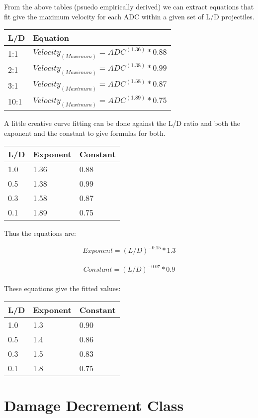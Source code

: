 From the above tables (psuedo empirically derived) we can extract 
equations that fit give the maximum velocity for each ADC within a
given set of L/D projectiles.

\begin{tabular}{||l|l||} \hline 
L/D			& Equation \\ \hline 
1:1			& \(Velocity_{(Maximum)} = ADC^{(1.36)} * 0.88 \)\\  
2:1			& \(Velocity_{(Maximum)} = ADC^{(1.38)} * 0.99 \) \\
3:1			& \(Velocity_{(Maximum)} = ADC^{(1.58)} * 0.87 \) \\
10:1		& \(Velocity_{(Maximum)} = ADC^{(1.89)} * 0.75 \) \\ 
\hline 
\end{tabular}

A little creative curve fitting can be done against the L/D ratio 
and both the exponent and the constant to give formulas for both.

\begin{tabular}{||l|l|l||} \hline 
L/D	& Exponent	& Constant \\ \hline 
1.0	& 1.36	   & 0.88 \\
0.5 & 1.38     & 0.99 \\
0.3 & 1.58     & 0.87 \\
0.1 & 1.89     & 0.75 \\ \hline 
\end{tabular}

Thus the equations are:

\[Exponent = (L/D)^{-0.15} * 1.3 \] \\  
\[Constant = (L/D)^{-0.07} * 0.9 \] \\

These equations give the fitted values:

\begin{tabular}{||l|l|l||} \hline   
L/D	& Exponent	& Constant \\ \hline 
1.0 & 1.3       &  0.90 \\
0.5 & 1.4       &  0.86 \\
0.3 & 1.5       &  0.83 \\
0.1 & 1.8       &  0.75 \\ \hline 
\end{tabular}

\section{Damage Decrement Class}

